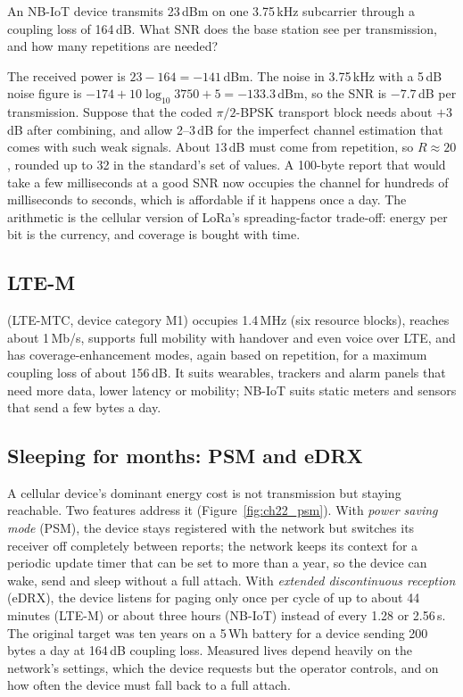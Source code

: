 \begin{worked}[Reaching 164 dB]
An NB-IoT device transmits 23\,dBm on one 3.75\,kHz subcarrier through a coupling loss of 164\,dB. What
SNR does the base station see per transmission, and how many repetitions are needed?

The received power is $23-164=-141$\,dBm. The noise in 3.75\,kHz with a 5\,dB noise figure is
$-174+10\log_{10}3750+5=-133.3$\,dBm, so the SNR is $-7.7$\,dB per transmission. Suppose that the
coded $\pi/2$-BPSK transport block needs about $+3$\,dB after combining, and allow 2--3\,dB for the
imperfect channel estimation that comes with such weak signals. About $13$\,dB must come from
repetition, so $R\approx20$, rounded up to 32 in the standard's set of values. A 100-byte report that
would take a few milliseconds at a good SNR now occupies the channel for hundreds of milliseconds to
seconds, which is affordable if it happens once a day. The arithmetic is the cellular version of
LoRa's spreading-factor trade-off: energy per bit is the currency, and coverage is bought with time.
\end{worked}

\subsection{LTE-M}

 (LTE-MTC, device category M1) occupies 1.4\,MHz (six resource blocks), reaches about
1\,Mb/s, supports full mobility with handover and even voice over LTE, and has coverage-enhancement
modes, again based on repetition, for a maximum coupling loss of about 156\,dB. It suits wearables,
trackers and alarm panels that need more data, lower latency or mobility; NB-IoT suits static meters
and sensors that send a few bytes a day.

\subsection{Sleeping for months: PSM and eDRX}

A cellular device's dominant energy cost is not transmission but staying reachable. Two features
address it (Figure~\ref{fig:ch22_psm}). With \emph{power saving mode} (PSM), the device stays
registered with the network but switches its receiver off completely between reports; the network
keeps its context for a periodic update timer that can be set to more than a year, so the device can
wake, send and sleep without a full attach. With \emph{extended discontinuous reception} (eDRX), the
device listens for paging only once per cycle of up to about 44 minutes (LTE-M) or about three hours
(NB-IoT) instead of every 1.28 or 2.56\,s. The original target was ten years on a 5\,Wh battery for a
device sending 200 bytes a day at 164\,dB coupling loss. Measured lives depend heavily on the
network's settings, which the device requests but the operator controls, and on how often the device
must fall back to a full attach.

